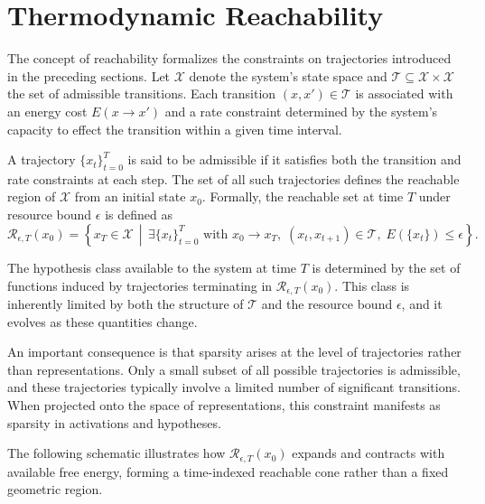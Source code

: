 \documentclass[12pt]{article}
\theoremstyle{plain}
\theoremstyle{definition}
\theoremstyle{remark}
\begin{document}
\section{Thermodynamic Reachability}

The concept of reachability formalizes the constraints on trajectories introduced in the preceding sections. Let $\mathcal{X}$ denote the system's state space and $\mathcal{T} \subseteq \mathcal{X} \times \mathcal{X}$ the set of admissible transitions. Each transition $(x, x') \in \mathcal{T}$ is associated with an energy cost $E(x \to x')$ and a rate constraint determined by the system's capacity to effect the transition within a given time interval.

A trajectory $\{x_t\}_{t=0}^T$ is said to be admissible if it satisfies both the transition and rate constraints at each step. The set of all such trajectories defines the reachable region of $\mathcal{X}$ from an initial state $x_0$. Formally, the reachable set at time $T$ under resource bound $\epsilon$ is defined as
\[
\mathcal{R}_{\epsilon,T}(x_0) = \left\{ x_T \in \mathcal{X} \,\middle|\, \exists \{x_t\}_{t=0}^T \text{ with } x_0 \to x_T, \; (x_t, x_{t+1}) \in \mathcal{T}, \; E(\{x_t\}) \leq \epsilon \right\}.
\]

The hypothesis class available to the system at time $T$ is determined by the set of functions induced by trajectories terminating in $\mathcal{R}_{\epsilon,T}(x_0)$. This class is inherently limited by both the structure of $\mathcal{T}$ and the resource bound $\epsilon$, and it evolves as these quantities change.

An important consequence is that sparsity arises at the level of trajectories rather than representations. Only a small subset of all possible trajectories is admissible, and these trajectories typically involve a limited number of significant transitions. When projected onto the space of representations, this constraint manifests as sparsity in activations and hypotheses.

The following schematic illustrates how $\mathcal{R}_{\epsilon,T}(x_0)$ expands and contracts with available free energy, forming a time-indexed reachable cone rather than a fixed geometric region.
\end{document}
